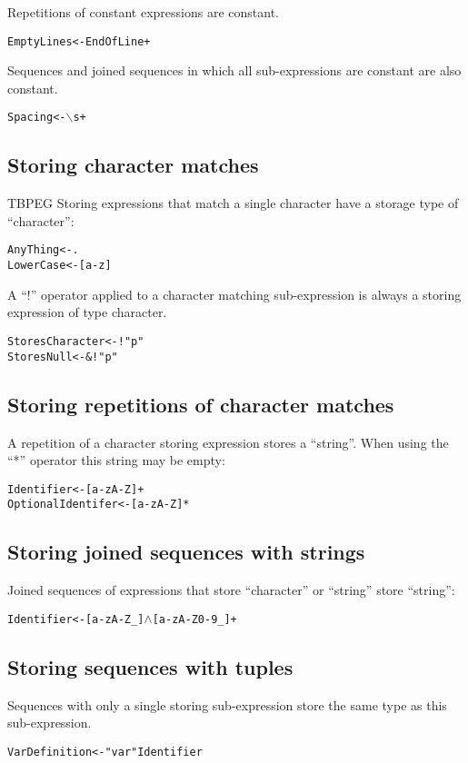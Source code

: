 \documentclass[a4paper,11pt]{article}
\begin{document}
Repetitions of constant expressions are constant.
\begin{alltt}
    EmptyLines <- EndOfLine+
\end{alltt}

Sequences and joined sequences in which all sub-expressions are constant are also constant.
\begin{alltt}
    Spacing <- \(\backslash\)s+
\end{alltt}

\subsection{Storing character matches}
TBPEG Storing expressions that match a single character have a storage type of ``character'':
\begin{alltt}
    AnyThing  <- .
    LowerCase <- [a-z]
\end{alltt}

A ``!'' operator applied to a character matching sub-expression is always a storing expression of type character.
\begin{alltt}
    StoresCharacter <- ! "p"
    StoresNull      <- \&! "p"
\end{alltt}

\subsection{Storing repetitions of character matches}
A repetition of a character storing expression stores a ``string''.
When using the ``*'' operator this string may be empty:
\begin{alltt}
    Identifier        <- [a-zA-Z]+
    OptionalIdentifer <- [a-zA-Z]*
\end{alltt}

\subsection{Storing joined sequences with strings}
Joined sequences of expressions that store ``character'' or ``string'' store ``string'':
\begin{alltt}
    Identifier <- [a-zA-Z\_] \(\wedge\) [a-zA-Z0-9\_]+
\end{alltt}

\subsection{Storing sequences with tuples}
Sequences with only a single storing sub-expression store the same type as this sub-expression.
\begin{alltt}
    VarDefinition <- "var" Identifier
\end{alltt}
\end{document}
